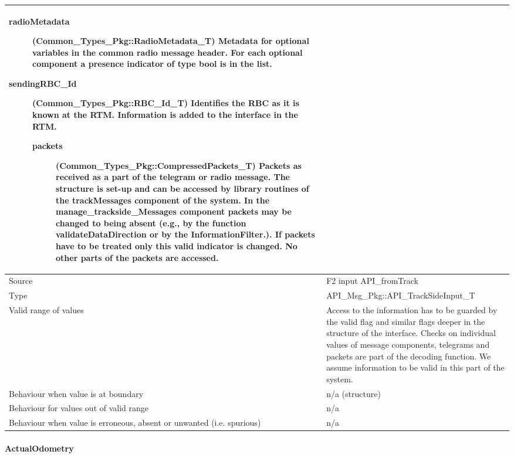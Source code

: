 \begin{longtable}{p{}p{}}
\begin{description}
\begin{description}
\item[radioMetadata](Common\_Types\_Pkg::RadioMetadata\_T) Metadata for optional variables in the common radio message header. For each optional component a presence indicator of type bool is in the list.  
\item[sendingRBC\_Id](Common\_Types\_Pkg::RBC\_Id\_T) Identifies the RBC as it is known at the RTM. Information is added to the interface in the RTM.
\begin{description}
\item[packets](Common\_Types\_Pkg::CompressedPackets\_T) Packets as received as a part of the telegram or radio message. The structure is set-up and can be accessed by library routines of the trackMessages component of the system. In the manage\_trackside\_Messages component packets may be changed to being absent (e.g., by the function validateDataDirection or by the InformationFilter.). If packets have to be treated only this valid indicator is changed. No other parts of the packets are accessed.
\end{description}
\end{description}
\end{description}
\\
\midrule
Source					& F2 input API\_fromTrack 
\\ 
\midrule
Type					& API\_Msg\_Pkg::API\_TrackSideInput\_T \\
\midrule
Valid range of values	& Access to the information has to be guarded by the valid flag and similar flags deeper in the structure of the interface. Checks on individual values of message components, telegrams and packets are part of the decoding function. We assume information to be valid in this part of the system.\\
\midrule
Behaviour when value is at boundary	& n/a (structure)\\
\midrule
Behaviour for values out of valid range	& n/a\\
\midrule
Behaviour when value is erroneous, absent or unwanted (i.e. spurious) &n/a\\
\bottomrule
\end{longtable}


\paragraph{ActualOdometry}

